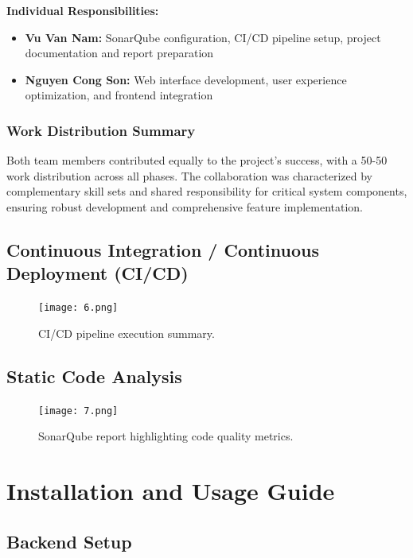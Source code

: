 \documentclass[13pt,a4paper]{report}
\begin{document}
\textbf{Individual Responsibilities:}
\begin{itemize}
    \item \textbf{Vu Van Nam:} SonarQube configuration, CI/CD pipeline setup, project documentation and report preparation
    \item \textbf{Nguyen Cong Son:} Web interface development, user experience optimization, and frontend integration
\end{itemize}

\subsection{Work Distribution Summary}
Both team members contributed equally to the project's success, with a 50-50 work distribution across all phases. The collaboration was characterized by complementary skill sets and shared responsibility for critical system components, ensuring robust development and comprehensive feature implementation.

\section{Continuous Integration / Continuous Deployment (CI/CD)}
\begin{figure}[h!]
    \centering
    \texttt{[image: 6.png]}
    \caption{CI/CD pipeline execution summary.}
\end{figure}

\section{Static Code Analysis}
\begin{figure}[h!]
    \centering
    \texttt{[image: 7.png]}
    \caption{SonarQube report highlighting code quality metrics.}
\end{figure}

\chapter{Installation and Usage Guide}
\section{Backend Setup}
\end{document}
